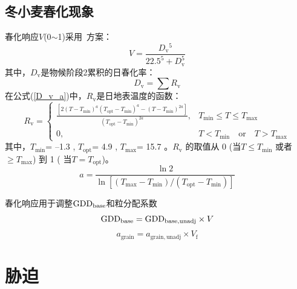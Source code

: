 \subsection{冬小麦春化现象}
春化响应$V$(0$\sim$1)采用~\citet{streck2003incorporating}方案：
\begin{equation}
  V=\frac{D_{\mathrm{v}}{ }^{5}}{22.5^{5}+D_{\mathrm{v}}^{5}}
\end{equation}
其中，$D_{\mathrm {v}} $是物候阶段2累积的日春化率：
\begin{equation}\label{D_v_a}
  D_{\mathrm{v}}=\sum R_{\mathrm{v}}
\end{equation}
在公式(\ref{D_v_a})中，$R_{\mathrm{v}}$是日地表温度的函数：
\begin{equation}
  R_{\mathrm{v}} = \begin{cases}
    \frac{\left[2\left(T-T_{\mathrm{min}}\right)^{a}\left(T_{\mathrm{opt}}-T_{\mathrm{min}}\right)^{a} - \left(T-T_{\mathrm{min}}\right)^{2a}\right]}{\left(T_{\mathrm{opt}}-T_{\mathrm{min}}\right)^{2a}}, &T_{\mathrm{min}} \leqslant T \leqslant T_{\mathrm{max}} \\
    0,  &T<T_{\mathrm{min}} \quad  \text{or} \quad T>T_{\mathrm{max}}
  \end{cases}
\end{equation}
其中，$T_{\mathrm{min}}$= –1.3 \textcelsius, $T_{\mathrm{opt}}$= 4.9 \textcelsius, $T_{\mathrm{max}}$= 15.7 \textcelsius。$ R_{\mathrm {v}} $ 的取值从 0 (当$ T\leqslant T_{\mathrm{min}}$ 或者 $ \geqslant  T_{\mathrm{max}}$) 到 1 ( 当$T=T_{\mathrm{opt}}$)。
\begin{equation}
  a=\frac{\ln 2}{\ln \left[\left(T_{\max }-T_{\min }\right) /\left(T_{\mathrm{o p t}}-T_{\min }\right)\right]}
\end{equation}

春化响应用于调整${\rm GDD}_{\mathrm{base}}$和粒分配系数
\begin{equation}
  {\rm GDD}_{\mathrm{base}}={\rm GDD}_{\mathrm{b a s e,  { unadj }}} \times V
\end{equation}
\begin{equation}
  a_{\mathrm{ {grain }}}=a_{\mathrm{ {grain,unadj }}} \times V_{\mathrm{f}}
\end{equation}


\section{胁迫}
